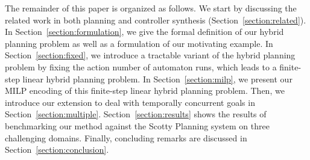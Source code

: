 \documentclass[sigconf]{acmart}
\begin{document}
The remainder of this paper is organized as follows. We start by discussing the related work in both planning and controller synthesis (Section~\ref{section:related}). In Section~\ref{section:formulation}, we give the formal definition of our hybrid planning problem as well as a formulation of our motivating example. In Section~\ref{section:fixed}, we introduce a tractable variant of the hybrid planning problem by fixing the action number of automaton runs, which leads to a finite-step linear hybrid planning problem. In Section~\ref{section:milp}, we present our MILP encoding of this finite-step linear hybrid planning problem. Then, we introduce our extension to deal with temporally concurrent goals in Section~\ref{section:multiple}. Section~\ref{section:results} shows the results of benchmarking our method against the Scotty Planning system on three challenging domains. Finally, concluding remarks are discussed in Section~\ref{section:conclusion}.






\end{document}
